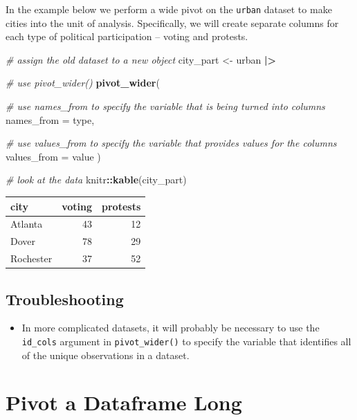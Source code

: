 \documentclass[
]{book}
\newenvironment{Shaded}{\begin{snugshade}}{\end{snugshade}}
\newcommand{\AttributeTok}[1]{\textcolor[rgb]{0.13,0.29,0.53}{#1}}
\newcommand{\CommentTok}[1]{\textcolor[rgb]{0.56,0.35,0.01}{\textit{#1}}}
\newcommand{\FunctionTok}[1]{\textcolor[rgb]{0.13,0.29,0.53}{\textbf{#1}}}
\newcommand{\NormalTok}[1]{#1}
\newcommand{\OtherTok}[1]{\textcolor[rgb]{0.56,0.35,0.01}{#1}}
\newcommand{\SpecialCharTok}[1]{\textcolor[rgb]{0.81,0.36,0.00}{\textbf{#1}}}
\providecommand{\tightlist}{%
  \setlength{\itemsep}{0pt}\setlength{\parskip}{0pt}}
\begin{document}
In the example below we perform a wide pivot on the \texttt{urban} dataset to make cities into the unit of analysis. Specifically, we will create separate columns for each type of political participation -- voting and protests.

\begin{Shaded}
\begin{Highlighting}[]
\CommentTok{\# assign the old dataset to a new object}
\NormalTok{city\_part }\OtherTok{\textless{}{-}}\NormalTok{ urban }\SpecialCharTok{|\textgreater{}}
  
  \CommentTok{\# use pivot\_wider()}
  \FunctionTok{pivot\_wider}\NormalTok{(}
    
    \CommentTok{\# use \textasciigrave{}names\_from\textasciigrave{} to specify the variable that is being turned into columns}
    \AttributeTok{names\_from =}\NormalTok{ type,}
    
    \CommentTok{\# use \textasciigrave{}values\_from\textasciigrave{} to specify the variable that provides values for the columns}
    \AttributeTok{values\_from =}\NormalTok{ value}
\NormalTok{  )}

\CommentTok{\# look at the data}
\NormalTok{knitr}\SpecialCharTok{::}\FunctionTok{kable}\NormalTok{(city\_part)}
\end{Highlighting}
\end{Shaded}

\begin{tabular}{l|r|r}
\hline
city & voting & protests\\
\hline
Atlanta & 43 & 12\\
\hline
Dover & 78 & 29\\
\hline
Rochester & 37 & 52\\
\hline
\end{tabular}

\hypertarget{troubleshooting-22}{%
\subsection{Troubleshooting}\label{troubleshooting-22}}

\begin{itemize}
\tightlist
\item
  In more complicated datasets, it will probably be necessary to use the \texttt{id\_cols} argument in \texttt{pivot\_wider()} to specify the variable that identifies all of the unique observations in a dataset.
\end{itemize}

\hypertarget{pivot_long}{%
\section{Pivot a Dataframe Long}\label{pivot_long}}
\end{document}
